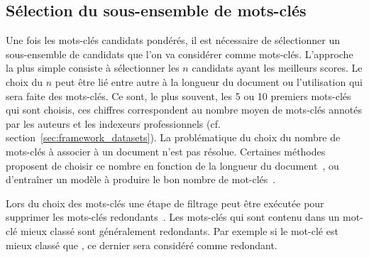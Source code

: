 

\subsection{Sélection du sous-ensemble de mots-clés}\label{choisir-le-sous-ensemble}

Une fois les mots-clés candidats pondérés, il est nécessaire de sélectionner un sous-ensemble de candidats que l'on va considérer comme mots-clés.
L'approche la plus simple consiste à sélectionner les $n$ candidats ayant les meilleurs scores.
Le choix du $n$ peut être lié entre autre à la longueur du document ou l'utilisation qui sera faite des mots-clés. %
Ce sont, le plus souvent, les 5 ou 10 premiers mots-clés qui sont choisis, ces chiffres correspondent au nombre moyen de mots-clés annotés par les auteurs et les indexeurs professionnels (cf. section~\ref{sec:framework_datasets}).
La problématique du choix du nombre de mots-clés à associer à un document n'est pas résolue.
Certaines méthodes proposent de choisir ce nombre en fonction de la longueur du document~\cite{mihalcea_textrank:_2004}, ou d'entraîner un modèle à produire le bon nombre de mot-clés~\cite[\textit{inter alia}]{yuan_generating_2018, chen_exclusive_2020}.

Lors du choix des mots-clés une étape de filtrage peut être exécutée pour supprimer les mots-clés redondants~\cite{hasan_automatic_2014}.
Les mots-clés qui sont contenu dans un mot-clé mieux classé sont généralement redondants. Par exemple si le mot-clé  est mieux classé que , ce dernier sera considéré comme redondant.

